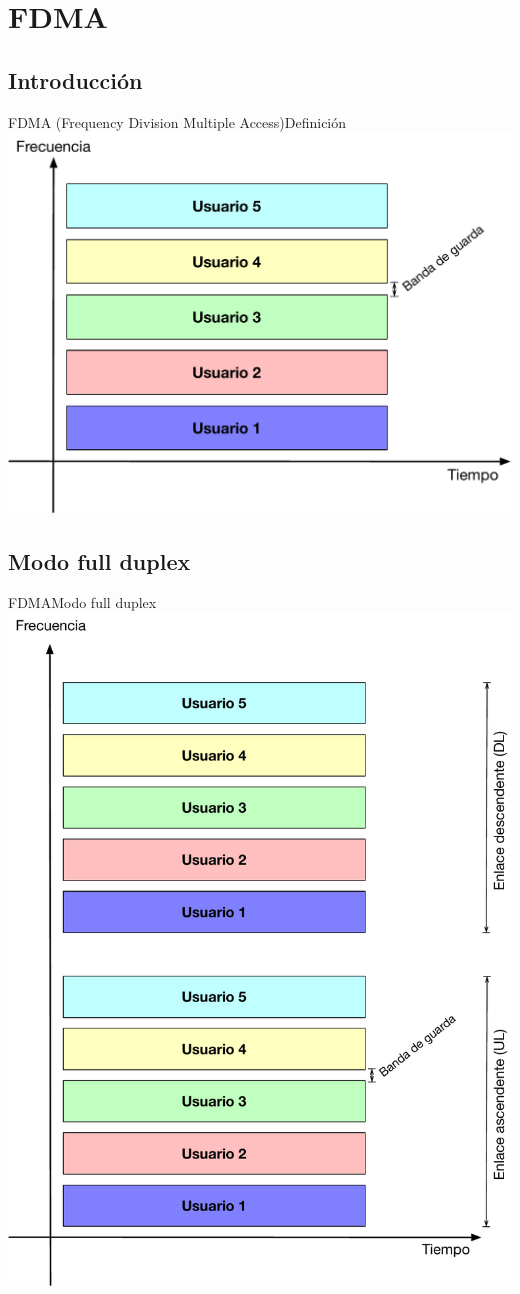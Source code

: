 \documentclass[10pt,compress]{beamer} %
\begin{document}
\section{FDMA}

\subsection{Introducción}
\begin{frame}{FDMA (Frequency Division Multiple Access)}{Definición}
	\centering \includegraphics[width=0.8\linewidth]{../Apuntes/Figuras/FDMA.pdf}
\end{frame}

\subsection{Modo full duplex}
\begin{frame}{FDMA}{Modo full duplex}
  \centering \includegraphics[width=0.4\linewidth]{../Apuntes/Figuras/FDMA_FD.pdf}
\end{frame}
\end{document}
